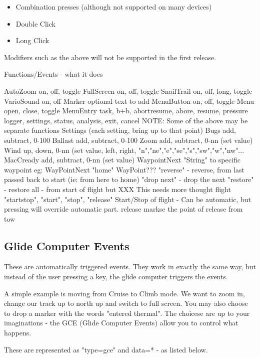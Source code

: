 \begin{itemize}
\item Combination presses (although not supported on many devices)
\item Double Click
\item Long Click
\end{itemize}

Modifiers such as the above will not be supported in the first release.

\begin{verb}
Functions/Events - what it does

AutoZoom		on, off, toggle 
FullScreen		on, off, toggle
SnailTrail 		on, off, long, toggle
VarioSound 		on, off
Marker 			optional text to add
MenuButton 		on, off, toggle
Menu			open, close, toggle
MenuEntry		task, b+b, abortresume, abore, resume, pressure
logger, settings, status, analysis, exit, cancel
NOTE: Some of the above may be separate functions
Settings		(each setting, bring up to that point)
Bugs			add, subtract, 0-100%
Ballast			add, subtract, 0-100%
Zoom			add, subtract, 0-nn (set value)
Wind			up, down, 0-nn (set value, left, right, "n","ne","e","se","s","sw","w","nw"...
MacCready		add, subtract, 0-nn (set value)
WaypointNext		"String" to specific waypoint
eg: WayPointNext "home"
WayPoint???		"reverse" - reverse, from last passed back to start (ie: from here to home)
"drop next" - drop the next
"restore" - restore all - from start of flight but 
XXX This needs more thought
flight 			"startstop", "start", "stop", "release"
Start/Stop of flight - Can be automatic, but pressing will override
automatic part.
release 		markse the point of release from tow
\end{verb}

\subsection{Glide Computer Events}

These are automatically triggered events. They work in exactly the
same way, but instead of the user pressing a key, the glide computer
triggers the events.

A simple example is moving from Cruise to Climb mode. We want to zoom
in, change our track up to north up and switch to full screen. You may
also choose to drop a marker with the words "entered thermal". The
choicese are up to your imaginations - the GCE (Glide Computer Events)
allow you to control what happens.

These are represented as "type=gce" and data=* - as listed below.

